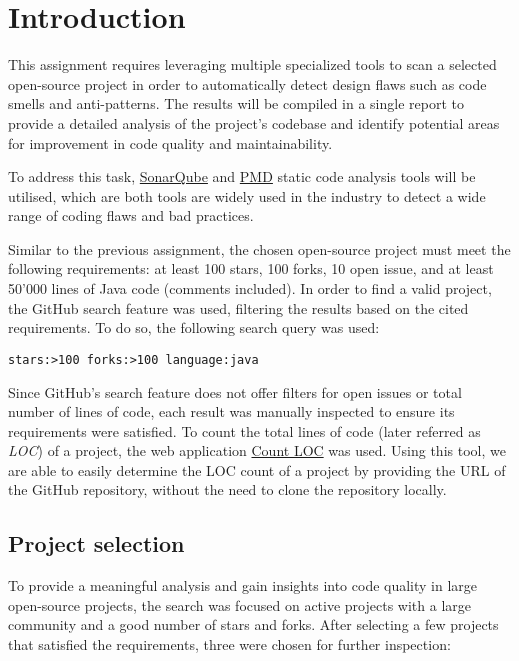\section{Introduction}

This assignment requires leveraging multiple specialized tools to scan a selected open-source project in order to automatically detect design flaws such as code smells and anti-patterns. The results will be compiled in a single report to provide a detailed analysis of the project's codebase and identify potential areas for improvement in code quality and maintainability.

To address this task, \href{https://www.sonarqube.org}{SonarQube} and \href{https://pmd.github.io/}{PMD} static code analysis tools will be utilised, which are both tools are widely used in the industry to detect a wide range of coding flaws and bad practices.

Similar to the previous assignment, the chosen open-source project must meet the following requirements: at least 100 stars, 100 forks, 10 open issue, and at least 50'000 lines of Java code (comments included). In order to find a valid project, the GitHub search feature was used, filtering the results based on the cited requirements. To do so, the following search query was used:

\begin{lstlisting}[caption=GitHub search query]
                    stars:>100 forks:>100 language:java
\end{lstlisting}

\noindent Since GitHub's search feature does not offer filters for open issues or total number of lines of code, each result was manually inspected to ensure its requirements were satisfied. To count the total lines of code (later referred as \emph{LOC}) of a project, the web application \href{https://codetabs.com/count-loc/count-loc-online.html}{Count LOC} was used. Using this tool, we are able to easily determine the LOC count of a project by providing the URL of the GitHub repository, without the need to clone the repository locally.

\subsection{Project selection}

To provide a meaningful analysis and gain insights into code quality in large open-source projects, the search was focused on active projects with a large community and a good number of stars and forks. After selecting a few projects that satisfied the requirements, three were chosen for further inspection:

